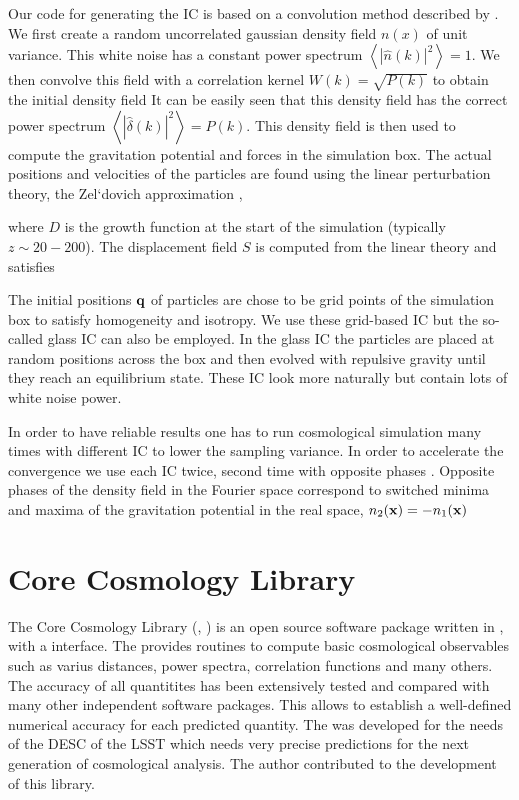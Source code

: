 Our code for generating the IC is based on a convolution method described by \textcite{1997ApJ...490L.127P}. We first create a random uncorrelated gaussian density field $n(x)$ of unit variance. This white noise has a constant power spectrum $\left\langle|\hat n(k)|^2\right\rangle=1$. We then convolve this field with a correlation kernel $W(k)=\sqrt{P(k)}$ to obtain the initial  density field
It can be easily seen that this density field has the correct power spectrum $\left\langle|\hat\delta(k)|^2\right\rangle=P(k)$. This density field is then used to compute the gravitation potential and forces in the simulation box. The actual positions and velocities of the particles are found using the linear perturbation theory, the Zel`dovich approximation \parencite{1970A&A.....5...84Z},
\begin{sloppypar}
where $D$ is the growth function at the start of the simulation (typically ${z\sim20-200}$). The displacement field $S$ is computed from the linear theory and satisfies
\end{sloppypar}
The initial positions $\mathbf q$ of particles are chose to be grid points of the simulation box to satisfy homogeneity and isotropy. We use these grid-based IC but the so-called glass IC can also be employed. In the glass IC the particles are placed at random positions across the box and then evolved with repulsive gravity until they reach an equilibrium state. These IC look more naturally but contain lots of white noise power.

In order to have reliable results one has to run cosmological simulation many times with different IC to lower the sampling variance. In order to accelerate the convergence we use each IC twice, second time with opposite phases \parencite{PhysRevD.93.103519}. Opposite phases of the density field in the Fourier space correspond to switched minima and maxima of the gravitation potential in the real space, $n_2(\mathbf x)=-n_1(\mathbf x)$

\section{Core Cosmology Library}
The Core Cosmology Library (, \textcite{2019ApJS..242....2C}) is an open source software package written in , with a  interface. The  provides routines to compute basic cosmological observables such as varius distances, power spectra, correlation functions and many others. The accuracy of all quantitites has been extensively tested and compared with many other independent software packages. This allows to establish a well-defined numerical accuracy for each predicted quantity. The  was developed for the needs of the DESC of the LSST which needs very precise predictions for the next generation of cosmological analysis. The author contributed to the development of this library.

